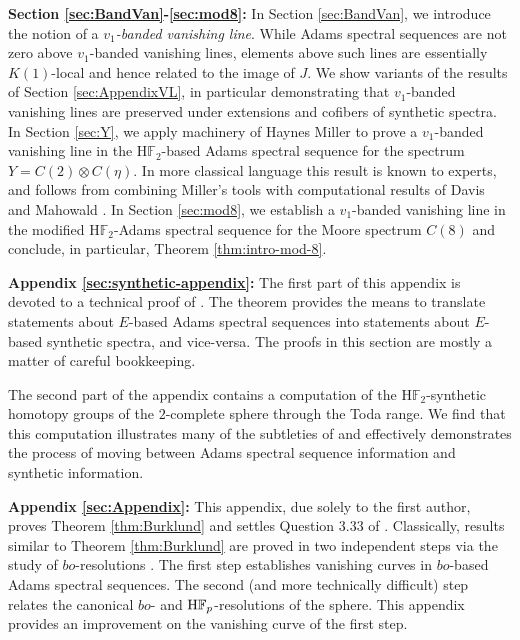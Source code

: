 \vspace{1ex}
\noindent \textbf{Section \ref{sec:BandVan}-\ref{sec:mod8}:} In Section \ref{sec:BandVan}, we introduce the notion of a \emph{$v_1$-banded vanishing line}.  While Adams spectral sequences are not zero above $v_1$-banded vanishing lines, elements above such lines are essentially $K(1)$-local and hence related to the image of $J$.  We show variants of the results of Section \ref{sec:AppendixVL}, in particular demonstrating that $v_1$-banded vanishing lines are preserved under extensions and cofibers of synthetic spectra.  In Section \ref{sec:Y}, we apply machinery of Haynes Miller \cite{Miller} to prove a $v_1$-banded vanishing line in the $\mathrm{H}\mathbb{F}_2$-based Adams spectral sequence for the spectrum $Y = C(2) \otimes C(\eta)$.  In more classical language this result is known to experts, and follows from combining Miller's tools with computational results of Davis and Mahowald \cite{v1ExtDavisMahowald}.  In Section \ref{sec:mod8}, we establish a $v_1$-banded vanishing line in the modified $\mathrm{H}\mathbb{F}_2$-Adams spectral sequence for the Moore spectrum $C(8)$ and conclude, in particular, Theorem \ref{thm:intro-mod-8}. 
%

\vspace{1ex}
\noindent \textbf{Appendix \ref{sec:synthetic-appendix}:} The first part of this appendix is devoted to a technical proof of . The theorem provides the means to translate statements about $E$-based Adams spectral sequences into statements about $E$-based synthetic spectra, and vice-versa. The proofs in this section are mostly a matter of careful bookkeeping. 

The second part of the appendix contains a computation of the $\mathrm{H}\mathbb{F}_2$-synthetic homotopy groups of the $2$-complete sphere through the Toda range.  We find that this computation illustrates many of the subtleties of  and effectively demonstrates the process of moving between Adams spectral sequence information and synthetic information.

\vspace{1ex}
\noindent \textbf{Appendix \ref{sec:Appendix}:} This appendix, due solely to the first author, proves Theorem \ref{thm:Burklund} and settles Question 3.33 of \cite{Akhil}.
Classically, results similar to Theorem \ref{thm:Burklund} are proved in two independent steps via the study of $bo$-resolutions \cite{DM3, Gonzalez}. The first step establishes vanishing curves in $bo$-based Adams spectral sequences. The second (and more technically difficult) step relates the canonical $bo$- and $\mathrm{H}\mathbb{F}_p$-resolutions of the sphere. This appendix provides an improvement on the vanishing curve of the first step.

